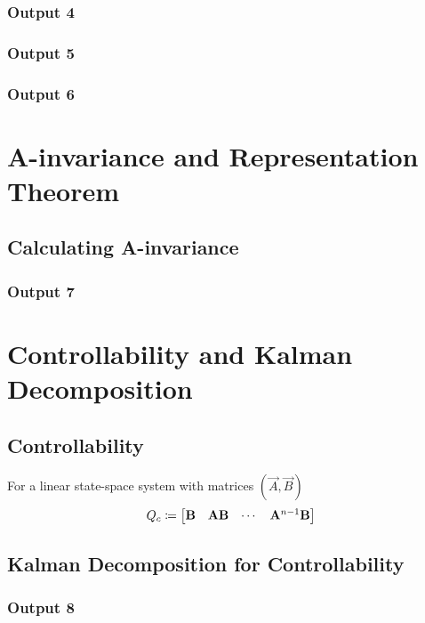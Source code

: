 \documentclass[10pt]{article}
\begin{document}
\subsubsection{Output 4}

\subsubsection{Output 5}
\subsubsection{Output 6}

\section{A-invariance and Representation Theorem}
\subsection{Calculating A-invariance}
\subsubsection{Output 7}

\section{Controllability and Kalman Decomposition}
\subsection{Controllability}
For a linear state-space system with matrices $(\vec{A},\vec{B})$
\[
    Q_c \coloneqq \begin{bmatrix} \mathbf{B} & \mathbf{A}\mathbf{B} & \cdots & \mathbf{A}^{n-1}\mathbf{B} \end{bmatrix}
\]
\subsection{Kalman Decomposition for Controllability}
\subsubsection{Output 8}
\end{document}
